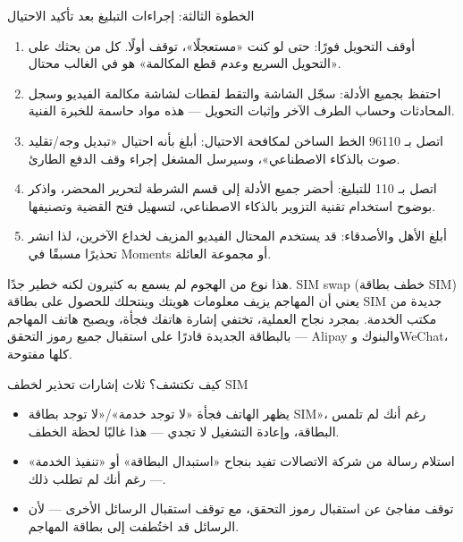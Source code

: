 \begin{tcbwarn}{الخطوة الثالثة: إجراءات التبليغ بعد تأكيد الاحتيال}
\begin{enumerate}
  \item أوقف التحويل فورًا: حتى لو كنت «مستعجلًا»، توقف أولًا. كل من يحثك على «التحويل السريع وعدم قطع المكالمة» هو في الغالب محتال.
  \item احتفظ بجميع الأدلة: سجّل الشاشة والتقط لقطات لشاشة مكالمة الفيديو وسجل المحادثات وحساب الطرف الآخر وإثبات التحويل — هذه مواد حاسمة للخبرة الفنية.
  \item اتصل بـ 96110 الخط الساخن لمكافحة الاحتيال: أبلغ بأنه احتيال «تبديل وجه/تقليد صوت بالذكاء الاصطناعي»، وسيرسل المشغل إجراء وقف الدفع الطارئ.
  \item اتصل بـ 110 للتبليغ: أحضر جميع الأدلة إلى قسم الشرطة لتحرير المحضر، واذكر بوضوح استخدام تقنية التزوير بالذكاء الاصطناعي، لتسهيل فتح القضية وتصنيفها.
  \item أبلغ الأهل والأصدقاء: قد يستخدم المحتال الفيديو المزيف لخداع الآخرين، لذا انشر تحذيرًا مسبقًا في Moments أو مجموعة العائلة.
\end{enumerate}

\end{tcbwarn}


هذا نوع من الهجوم لم يسمع به كثيرون لكنه خطير جدًا. SIM swap (خطف بطاقة SIM) يعني أن المهاجم يزيف معلومات هويتك وينتحلك للحصول على بطاقة SIM جديدة من مكتب الخدمة. بمجرد نجاح العملية، تختفي إشارة هاتفك فجأة، ويصبح هاتف المهاجم بالبطاقة الجديدة قادرًا على استقبال جميع رموز التحقق — Alipay والبنوك وWeChat، كلها مفتوحة.

\begin{tcbinfo}{كيف تكتشف؟ ثلاث إشارات تحذير لخطف SIM}
\begin{itemize}
  \item يظهر الهاتف فجأة «لا توجد خدمة»/«لا توجد بطاقة SIM»، رغم أنك لم تلمس البطاقة، وإعادة التشغيل لا تجدي — هذا غالبًا لحظة الخطف.
  \item استلام رسالة من شركة الاتصالات تفيد بنجاح «استبدال البطاقة» أو «تنفيذ الخدمة» — رغم أنك لم تطلب ذلك.
  \item توقف مفاجئ عن استقبال رموز التحقق، مع توقف استقبال الرسائل الأخرى — لأن الرسائل قد اختُطفت إلى بطاقة المهاجم.
\end{itemize}

\end{tcbinfo}

